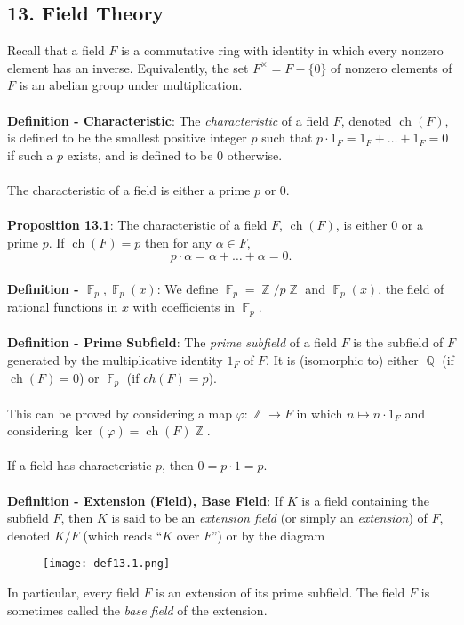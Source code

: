 \documentclass{article}
\DeclareMathOperator{\Z}{\mathbb{Z}}
\DeclareMathOperator{\Q}{\mathbb{Q}}
\DeclareMathOperator{\F}{\mathbb{F}}
\DeclareMathOperator{\ch}{ch}
\begin{document}
\subsection*{13. Field Theory}
Recall that a field $F$ is a commutative ring with identity in which every nonzero element has an inverse. Equivalently, the set $F^\times = F - \{0\}$ of nonzero elements of $F$ is an abelian group under multiplication. \\ \\
\textbf{Definition - Characteristic}: The \textit{characteristic} of a field $F$, denoted $\ch(F)$, is defined to be the smallest positive integer $p$ such that $p \cdot 1_F = 1_F + \dots + 1_F = 0$ if such a $p$ exists, and is defined to be 0 otherwise. \\ \\
The characteristic of a field is either a prime $p$ or 0. \\ \\
\textbf{Proposition 13.1}: The characteristic of a field $F$, $\ch(F)$, is either $0$ or a prime $p$. If $\ch(F) = p$ then for any $\alpha \in F$, $$p \cdot \alpha = \alpha + \dots + \alpha = 0.$$ \\
\textbf{Definition - $\F_p, \F_p(x)$}: We define $\F_p = \Z/p\Z$ and $\F_p(x)$, the field of rational functions in $x$ with coefficients in $\F_p$. \\ \\
\textbf{Definition - Prime Subfield}: The \textit{prime subfield} of a field $F$ is the subfield of $F$ generated by the multiplicative identity $1_F$ of $F$. It is (isomorphic to) either $\Q$ (if $\ch(F) = 0$) or $\F_p$ (if $ch(F) = p$). \\ \\
This can be proved by considering a map $\varphi: \Z \rightarrow F$ in which $n \mapsto n \cdot 1_F$ and considering $\ker(\varphi) = \ch(F)\Z$. \\ \\
If a field has characteristic $p$, then $0 = p \cdot 1 = p$. \\ \\
\textbf{Definition - Extension (Field), Base Field}: If $K$ is a field containing the subfield $F$, then $K$ is said to be an \textit{extension field} (or simply an \textit{extension}) of $F$, denoted $K / F$ (which reads ``$K$ over $F$'') or by the diagram \vspace{-4mm} \begin{figure}[H]
\begin{center}
\texttt{[image: def13.1.png]}
\end{center}
\end{figure} \vspace{-7mm} \noindent In particular, every field $F$ is an extension of its prime subfield. The field $F$ is sometimes called the \textit{base field} of the extension. \\ \\
\end{document}
